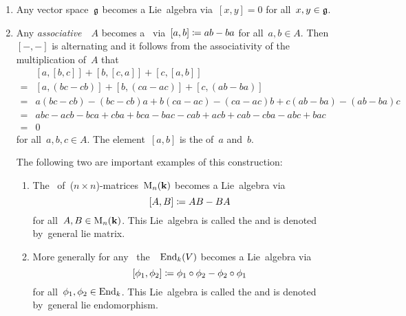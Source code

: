 \begin{examples}
  \leavevmode
  \begin{enumerate}
    \item
      Any vector space~$\mathfrak{g}$ becomes a Lie~algebra via~$[x,y] = 0$ for all~$x,y \in \mathfrak{g}$.
    \item
      Any \emph{associative}~{\algebra{$\kf$}}~$A$ becomes a~{} via~$[a,b] \coloneqq ab - ba$ for all~$a, b \in A$.
      Then~$[-, -]$ is alternating and it follows from the associativity of the multiplication of~$A$ that
      \begin{align*}
         {}&  [a,[b,c]] + [b,[c,a]] + [c,[a,b]] \\
        ={}&  [a, (bc-cb)] + [b, (ca-ac)] + [c, (ab-ba)] \\
        ={}&  a(bc-cb)-(bc-cb)a + b(ca-ac) - (ca-ac)b + c(ab-ba) - (ab-ba)c \\
        ={}&  abc - acb - bca + cba + bca - bac - cab + acb + cab - cba - abc + bac \\
        ={}&  0
    \end{align*}
    for all~$a, b, c \in A$.
    The element~$[a,b]$ is the  of~$a$ and~$b$.
   
    The following two are important examples of this construction:
    \begin{enumerate}
      \item
        The~{\algebra{$\kf$}} of~($n \times n$)-matrices~$\operatorname{M}_n(\mathbf{k})$ becomes a Lie~algebra via
        \[
          [A,B]
          \coloneqq
          AB - BA
        \]
        for all~$A, B \in \operatorname{M}_n(\mathbf{k})$.
        This Lie~algebra is called the  and is denoted by~\gls*{general lie matrix}.
      \item
        More generally for any~{\vectorspace{$\kf$}} the~{\algebra{$\kf$}}~$\operatorname{End}_k(V)$ becomes a Lie~algebra via
        \[
          [\phi_1, \phi_2]
          \coloneqq
          \phi_1 \circ \phi_2 - \phi_2 \circ \phi_1
        \]
        for all~$\phi_1, \phi_2 \in \operatorname{End}_k$.
        This Lie~algebra is called the  and is denoted by~\gls*{general lie endomorphism}.
    \end{enumerate}
  \end{enumerate}
\end{examples}


